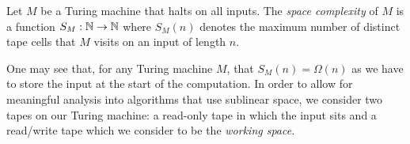 \begin{definition}
    Let $M$ be a Turing machine that halts on all inputs. The \emph{space complexity} of $M$ is a function $S_M: \mathbb N \to \mathbb N$ where $S_M(n)$ denotes the maximum number of distinct tape cells that $M$ visits on an input of length $n$. 
\end{definition}

One may see that, for any Turing machine $M$, that $S_M(n) = \Omega(n)$ as we have to store the input at the start of the computation. In order to allow for meaningful analysis into algorithms that use sublinear space, we consider two tapes on our Turing machine: a read-only tape in which the input sits and a read/write tape which we consider to be the \emph{working space}.
